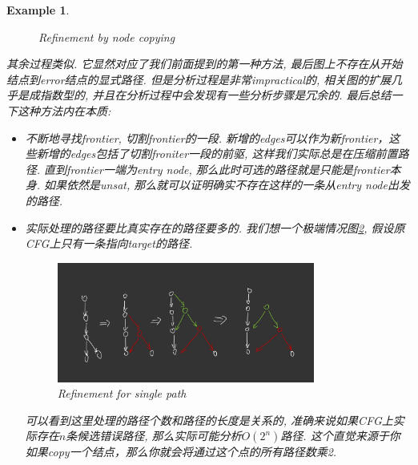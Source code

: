 \documentclass{article}
\newtheorem{example}[theorem]{Example}
\begin{document}
\begin{example}
\begin{figure}[H]
    \caption{Refinement by node copying}
    \label{fig:refine2}
    \end{figure}
其余过程类似. 它显然对应了我们前面提到的第一种方法, 最后图上不存在从开始结点到error结点的显式路径. 但是分析过程是非常impractical的, 相关图的扩展几乎是成指数型的, 并且在分析过程中会发现有一些分析步骤是冗余的. 最后总结一下这种方法内在本质:
\begin{itemize}
	\item 不断地寻找frontier, 切割frontier的一段. 新增的edges可以作为新frontier，这些新增的edges包括了切割froniter一段的前驱, 这样我们实际总是在压缩前置路径. 直到frontier一端为entry node, 那么此时可选的路径就是只能是frontier本身. 如果依然是unsat, 那么就可以证明确实不存在这样的一条从entry node出发的路径.
	\item 实际处理的路径要比真实存在的路径要多的. 我们想一个极端情况图\ref{fig:refine3}, 假设原CFG上只有一条指向target的路径.
	\begin{figure}[H]
    \centering
    \includegraphics[width=0.8\textwidth]{images/BFE42FBF-CA3E-492F-89B4-7F5677DA8246.jpeg}
    \caption{Refinement for single path}
    \label{fig:refine3}
    \end{figure}
    可以看到这里处理的路径个数和路径的长度是关系的, 准确来说如果CFG上实际存在$n$条候选错误路径, 那么实际可能分析$O(2^n)$路径. 这个直觉来源于你如果copy一个结点，那么你就会将通过这个点的所有路径数乘2.

\end{itemize}
\end{example}
\end{document}
